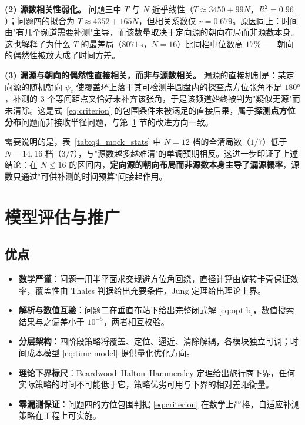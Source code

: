 \documentclass[12pt,a4paper]{ctexart}
\begin{document}
\textbf{(2) 源数相关性弱化。} 问题三中 $T$ 与 $N$ 近乎线性（$T\approx3450+99N$，$R^2=0.96$）；问题四的拟合为 $T\approx4352+165N$，但相关系数仅 $r=0.679$。原因同上：时间由"有几个频道需要补测"主导，而该数量取决于定向源的朝向布局而非源数本身。这也解释了为什么 $T$ 的最差局（$8071\,\text{s}$，$N=16$）比同档中位数高 $17\%$——朝向的偶然性被放大成了时间方差。

\textbf{(3) 漏源与朝向的偶然性直接相关，而非与源数相关。} 漏源的直接机制是：某定向源的随机朝向 $\psi_c$ 使覆盖环上落于其可检测半圆盘内的探查点方位张角不足 $180°$，补测的 $3$ 个等间距点又恰好未补齐该张角，于是该频道始终被判为"疑似无源"而未清除。这是式~\eqref{eq:criterion} 的包围条件未被满足的直接后果，属于\textbf{探测点方位分布}问题而非接收半径问题，与第~\ref{sec:eval} 节的改进方向一致。

需要说明的是，表~\ref{tab:q4_mock_stats} 中 $N=12$ 档的全清局数（$1/7$）低于 $N=14,16$ 档（$3/7$），与"源数越多越难清"的单调预期相反。这进一步印证了上述结论：在 $N\le16$ 的区间内，\textbf{定向源的朝向布局而非源数本身主导了漏源概率}，源数只通过"可供补测的时间预算"间接起作用。

\section{模型评估与推广}
\label{sec:eval}

\subsection{优点}

\begin{itemize}
  \item \textbf{数学严谨}：问题一用半平面求交规避方位角回绕，直径计算由旋转卡壳保证效率，覆盖性由 Thales 判据给出充要条件，Jung 定理给出理论上界。
  \item \textbf{解析与数值互验}：问题二在垂直布站下给出完整闭式解 \eqref{eq:opt-b}，数值搜索结果与之偏差小于 $10^{-5}$，两者相互校验。
  \item \textbf{分层架构}：四阶段策略将覆盖、定位、逼近、清除解耦，各模块独立可调；时间成本模型 \eqref{eq:time-model} 提供量化优化方向。
  \item \textbf{理论下界标尺}：Beardwood--Halton--Hammersley 定理给出旅行商下界，任何实际策略的时间不可能低于它，策略优劣可用与下界的相对差距衡量。
  \item \textbf{零漏测保证}：问题四的方位包围判据 \eqref{eq:criterion} 在数学上严格，自适应补测策略在工程上可实施。
\end{itemize}
\end{document}
